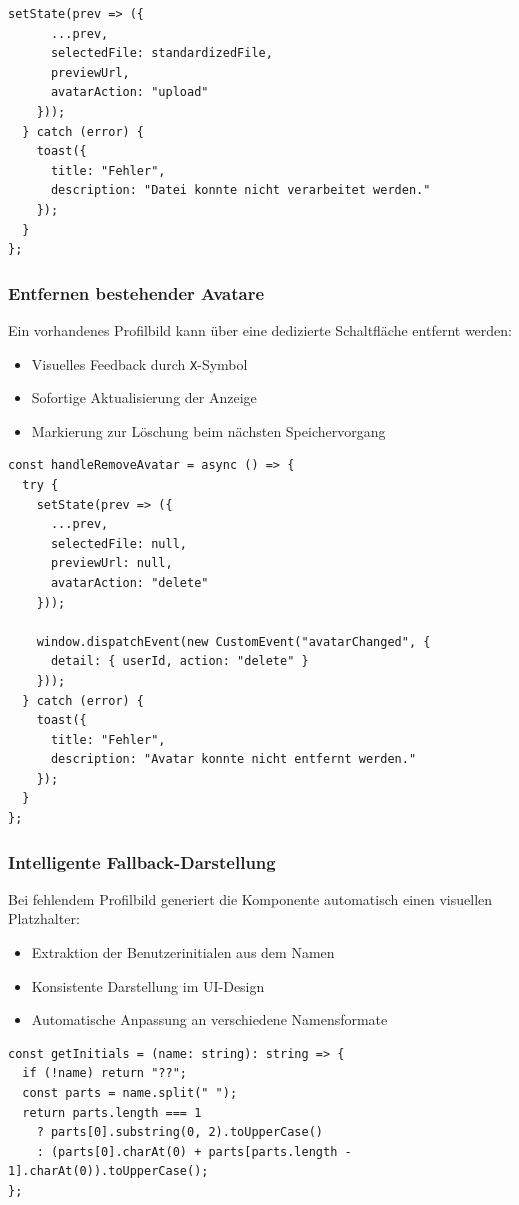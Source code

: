 \begin{inhalt}
\begin{lstlisting}[style=mytsx, caption={Implementierung des Avatar-Uploads mit Validierung}, label={lst:avatar_upload}]
    setState(prev => ({
      ...prev,
      selectedFile: standardizedFile,
      previewUrl,
      avatarAction: "upload"
    }));
  } catch (error) {
    toast({
      title: "Fehler",
      description: "Datei konnte nicht verarbeitet werden."
    });
  }
};
\end{lstlisting}

\subsubsection{Entfernen bestehender Avatare}
Ein vorhandenes Profilbild kann über eine dedizierte Schaltfläche entfernt werden:
\begin{itemize}
    \item Visuelles Feedback durch \texttt{X}-Symbol
    \item Sofortige Aktualisierung der Anzeige
    \item Markierung zur Löschung beim nächsten Speichervorgang
\end{itemize}

\begin{lstlisting}[style=mytsx, caption={Implementierung der Avatar-Löschung}, label={lst:avatar_delete}]
const handleRemoveAvatar = async () => {
  try {
    setState(prev => ({
      ...prev,
      selectedFile: null,
      previewUrl: null,
      avatarAction: "delete"
    }));
    
    window.dispatchEvent(new CustomEvent("avatarChanged", {
      detail: { userId, action: "delete" }
    }));
  } catch (error) {
    toast({
      title: "Fehler",
      description: "Avatar konnte nicht entfernt werden."
    });
  }
};
\end{lstlisting}

\subsubsection{Intelligente Fallback-Darstellung}
Bei fehlendem Profilbild generiert die Komponente automatisch einen visuellen Platzhalter:
\begin{itemize}
    \item Extraktion der Benutzerinitialen aus dem Namen
    \item Konsistente Darstellung im UI-Design
    \item Automatische Anpassung an verschiedene Namensformate
\end{itemize}

\begin{lstlisting}[style=mytsx, caption={Generierung der Fallback-Initialen}, label={lst:avatar_initials}]
const getInitials = (name: string): string => {
  if (!name) return "??";
  const parts = name.split(" ");
  return parts.length === 1
    ? parts[0].substring(0, 2).toUpperCase()
    : (parts[0].charAt(0) + parts[parts.length - 1].charAt(0)).toUpperCase();
};
\end{lstlisting}


\end{inhalt}
